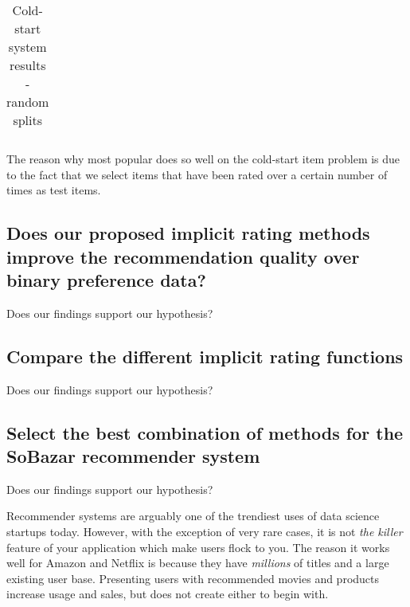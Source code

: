 \begin{table}[H]
{\begin{tabular}{*{17}{l}}
\bottomrule
\end{tabular}
}
\caption{Cold-start system results - random splits}
\end{table}













The reason why most popular does so well on the cold-start item problem is due to the fact that we select items that have been rated over a certain number of times as test items.

















\subsection{Does our proposed implicit rating methods improve the recommendation quality over binary preference data?}

Does our findings support our hypothesis?



\subsection{Compare the different implicit rating functions}

Does our findings support our hypothesis?

\subsection{Select the best combination of methods for the SoBazar recommender system}

Does our findings support our hypothesis?












Recommender systems are arguably one of the trendiest uses of data science startups today. However, with the exception of very
rare cases, it is not \emph{the killer} feature of your application which make users flock to you. The reason it works
well for Amazon and Netflix is because they have \emph{millions} of titles and a large existing user base. Presenting users
with recommended movies and products increase usage and sales, but does not create either to begin with.

